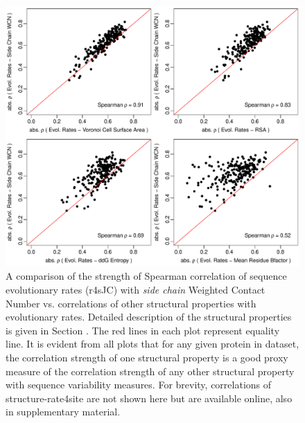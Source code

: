 \documentclass[11pt]{article}
\begin{document}
        \begin{figure}[tbh]
            \begin{center}
            \includegraphics[width=6.9in]{cordiv_similarities_r4sJC.pdf}
            \end{center}
            \caption{A comparison of the strength of Spearman correlation of sequence evolutionary rates (r4sJC) with {\it side chain} Weighted Contact Number vs. correlations of other structural properties with evolutionary rates. Detailed description of the structural properties is given in Section \label{sec:mam}. The red lines in each plot represent equality line. It is evident from all plots that for any given protein in dataset, the correlation strength of one structural property is a good proxy measure of the correlation strength of any other structural property with sequence variability measures. For brevity, correlations of structure-rate4site are not shown here but are available online, also in supplementary material.}
            \label{fig:seqent_structure_cors}
        \end{figure}
\end{document}
